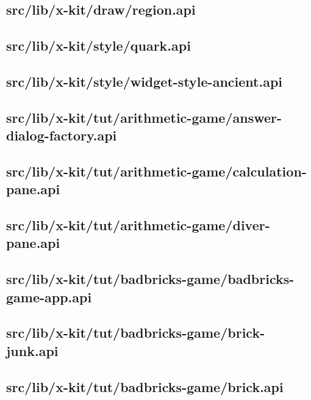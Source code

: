 \subsection{src/lib/x-kit/draw/region.api}


\subsection{src/lib/x-kit/style/quark.api}


\subsection{src/lib/x-kit/style/widget-style-ancient.api}


\subsection{src/lib/x-kit/tut/arithmetic-game/answer-dialog-factory.api}


\subsection{src/lib/x-kit/tut/arithmetic-game/calculation-pane.api}


\subsection{src/lib/x-kit/tut/arithmetic-game/diver-pane.api}


\subsection{src/lib/x-kit/tut/badbricks-game/badbricks-game-app.api}


\subsection{src/lib/x-kit/tut/badbricks-game/brick-junk.api}


\subsection{src/lib/x-kit/tut/badbricks-game/brick.api}


